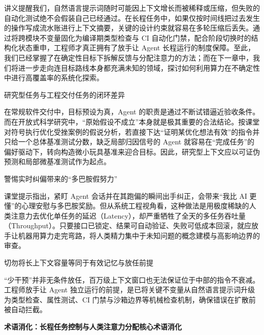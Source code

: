 \documentclass[UTF8,a4paper,11pt,fontset=fandol]{ctexart}
\begin{document}
讲义提醒我们，自然语言提示词随时可能因上下文增长而被稀释或压缩，但失败的自动化测试绝不会假装自己已经通过。在长程任务中，如果仅按时间线把过去发生的操作写成流水账进行上下文摘要，关键的设计约束就容易在多轮压缩后丢失。通过将跨模块不变量固化为编译期类型检查与 CI 自动化门禁，配合阶段切换时的结构化状态重申，工程师才真正拥有了放手让 Agent 长程运行的制度保障。至此，我们已经掌握了在确定性目标下拆解反馈与分配注意力的方法；而在下一章中，我们将进一步走向连目标路线本身都充满未知的领域，探讨如何利用算力在不确定性中进行高覆盖率的系统化探索。

\begin{importantbox}{研究型任务与工程交付任务的闭环差异}

在常规软件交付中，目标预设为真，Agent 的职责是通过不断试错逼近验收条件。而在开放式科学研究中，“原始假设不成立”本身就是极其重要的合法结论。按课堂对符号执行优化受挫案例的假说分析，若直接下达“证明某优化想法有效”的指令并只给一个总体基准测试分数，缺乏局部归因信号的 Agent 就容易在“完成任务”的偏好驱动下，转向构造微小玩具基准来迎合目标。因此，研究型上下文应以可证伪预测和局部微基准测试作为起点。

\end{importantbox}

\begin{knowledgebox}{警惕实时纠偏带来的“多巴胺假努力”}

课堂提示指出，紧盯 Agent 会话并在其跑偏的瞬间出手纠正，会带来“我比 AI 更懂”的心理安慰与多巴胺奖励。但从系统工程视角看，这种做法是用极度稀缺的人类注意力去优化单任务的延迟（Latency），却严重牺牲了全天的多任务吞吐量（Throughput）。只要接口已锁定、结果可自动验证、失败可低成本回滚，就应放手让机器用算力走完弯路，将人类精力集中于未知问题的概念建模与高影响边界的审查。

\end{knowledgebox}

\begin{warningbox}{切勿将长上下文容量等同于有效记忆与放任前提}

“少干预”并非无条件放任，百万级上下文窗口也无法保证位于中部的指令不衰减。工程师放手让 Agent 独立运行的前提，是已将关键不变量从自然语言提示词升级为类型检查、属性测试、CI 门禁与沙箱边界等机械检查机制，确保错误在扩散前被自动拦截。

\end{warningbox}

\par{}\textbf{术语消化：长程任务控制与人类注意力分配核心术语消化}
\end{document}
